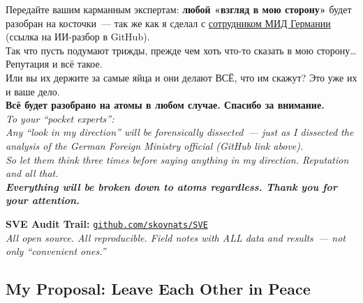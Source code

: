 \documentclass[11pt,a4paper]{article}
\theoremstyle{definition}
\theoremstyle{remark}
\begin{document}
\begin{warnbox}
\foreignlanguage{russian}{
Передайте вашим карманным экспертам:
\textbf{любой «взгляд в мою сторону»}
будет разобран на косточки~---
так же как я сделал с
\href{https://codeberg.org/skovnats/SVE-Systemic-Verification-Engineering/tree/master/Community/19112025BerlinBundestagSoloPerformance}%
{сотрудником МИД Германии}
(ссылка на ИИ-разбор в GitHub).\\[0.2cm]
Так что пусть подумают трижды, прежде чем
хоть что-то сказать в мою сторону\dots
Репутация и всё такое.\\[0.2cm]
Или вы их держите за самые яйца
и они делают ВСЁ, что им скажут?
Это уже их и ваше дело.\\[0.2cm]
\textbf{Всё будет разобрано на атомы в любом случае.
Спасибо за внимание.}
}\\[0.3cm]
\textit{To your ``pocket experts'':\\
Any ``look in my direction'' will be forensically dissected~---
just as I dissected the analysis of the German Foreign Ministry
official (GitHub link above).\\[0.2cm]
So let them think three times before saying anything
in my direction. Reputation and all that.\\[0.2cm]
\textbf{Everything will be broken down to atoms regardless.
Thank you for your attention.}}\\[0.3cm]
\begin{center}
  \textbf{SVE Audit Trail:}
  \href{https://github.com/skovnats/SVE}{\texttt{github.com/skovnats/SVE}}\\
  \small\textit{All open source. All reproducible.
  Field notes with ALL data and results~---
  not only ``convenient ones.''}
\end{center}
\end{warnbox}

\subsection{My Proposal: Leave Each Other in Peace}
\label{sec:london-proposal}
\end{document}

